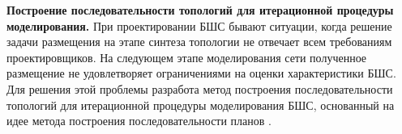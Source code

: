 
    

\textbf{Построение последовательности топологий для итерационной процедуры моделирования.}
При проектировании БШС бывают ситуации, когда решение задачи размещения на этапе синтеза топологии не отвечает всем требованиям проектировщиков. На следующем этапе моделирования сети полученное размещение не удовлетворяет ограничениями на оценки характеристики БШС. Для решения этой проблемы разработа метод построения последовательности топологий для итерационной процедуры моделирования БШС, основанный на идее метода построения последовательности планов \cite{Emelichev}.



